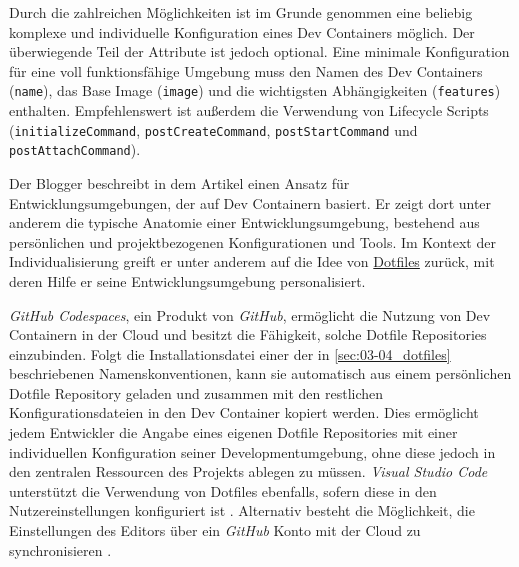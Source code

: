 Durch die zahlreichen Möglichkeiten ist im Grunde genommen eine beliebig komplexe und individuelle Konfiguration eines Dev Containers möglich. Der überwiegende Teil der Attribute ist jedoch optional. Eine minimale Konfiguration für eine voll funktionsfähige Umgebung muss den Namen des Dev Containers (\texttt{name}), das Base Image (\texttt{image}) und die wichtigsten Abhängigkeiten (\texttt{features}) enthalten. Empfehlenswert ist außerdem die Verwendung von Lifecycle Scripts (\texttt{initializeCommand}, \texttt{postCreateCommand}, \texttt{postStartCommand} und \texttt{postAttachCommand}). \cite{204:Development-Containers-Simplified}

Der Blogger \citeauthor{203:Dev-Environment-as-a-Code-with-DevContainers-Dotfiles-and-GitHub-Codespaces} beschreibt in dem Artikel  einen Ansatz für Entwicklungsumgebungen, der auf Dev Containern basiert. Er zeigt dort unter anderem die typische Anatomie einer Entwicklungsumgebung, bestehend aus persönlichen und projektbezogenen Konfigurationen und Tools. Im Kontext der Individualisierung greift er unter anderem auf die Idee von \hyperref[sec:03-04_dotfiles]{Dotfiles} zurück, mit deren Hilfe er seine Entwicklungsumgebung personalisiert. \cite{203:Dev-Environment-as-a-Code-with-DevContainers-Dotfiles-and-GitHub-Codespaces}

\textit{GitHub Codespaces}, ein Produkt von \textit{GitHub}, ermöglicht die Nutzung von Dev Containern in der Cloud und besitzt die Fähigkeit, solche Dotfile Repositories einzubinden. Folgt die Installationsdatei einer der in \autoref{sec:03-04_dotfiles} beschriebenen Namenskonventionen, kann sie automatisch aus einem persönlichen Dotfile Repository geladen und zusammen mit den restlichen Konfigurationsdateien in den Dev Container kopiert werden. \cite{304:Personalizing-GitHub-Codespaces-for-your-Account} Dies ermöglicht jedem Entwickler die Angabe eines eigenen Dotfile Repositories mit einer individuellen Konfiguration seiner Developmentumgebung, ohne diese jedoch in den zentralen Ressourcen des Projekts ablegen zu müssen. \textit{Visual Studio Code} unterstützt die Verwendung von Dotfiles ebenfalls, sofern diese in den Nutzereinstellungen konfiguriert ist \cite{201:How-to-develop-with-Dev-Containers}. Alternativ besteht die Möglichkeit, die Einstellungen des Editors über ein \textit{GitHub} Konto mit der Cloud zu synchronisieren \cite{304:Personalizing-GitHub-Codespaces-for-your-Account}.

